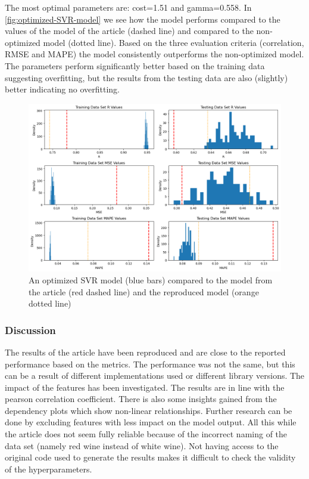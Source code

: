 \documentclass{article}
\begin{document}
The most optimal parameters are: cost=1.51 and gamma=0.558.
In \autoref{fig:optimized-SVR-model} we see how the model performs compared to the values of the model of the article \cite{dahal2021prediction} (dashed line) and compared to the non-optimized model (dotted line). 
Based on the three evaluation criteria (correlation, RMSE and MAPE) the model consistently outperforms the non-optimized model. The parameters perform significantly better based on the training data suggesting overfitting, but the results from the testing data are also (slightly) better indicating no overfitting.
\begin{figure}
	\centering
	\includegraphics[width=\linewidth]{figures/SVR_optimized_model.png}
	\caption{An optimized SVR model (blue bars) compared to the model from the article (red dashed line) and the reproduced model (orange dotted line)}
	\label{fig:optimized-SVR-model}
\end{figure}


\subsubsection{Discussion}
The results of the article have been reproduced and are close to the reported performance based on the metrics.
The performance was not the same, but this can be a result of different implementations used or different library versions.
The impact of the features has been investigated. The results are in line with the pearson correlation coefficient.
There is also some insights gained from the dependency plots which show non-linear relationships.
Further research can be done by excluding features with less impact on the model output.
All this while the article does not seem fully reliable because of the incorrect naming of the data set (namely red wine instead of white wine).
Not having access to the original code used to generate the results makes it difficult to check the validity of the hyperparameters.
\end{document}
